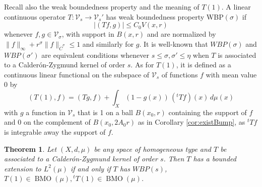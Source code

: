 \documentclass{amsart}
\numberwithin{equation}{section}
\theoremstyle{plain}
\newtheorem{theorem}[equation]{Theorem}
\theoremstyle{definition}
\theoremstyle{remark}
\begin{document}
{{{Recall also the weak boundedness property and the meaning of $T(1)$. A linear continuous operator  $T:\mathcal{V}_{s}\to \mathcal{V}_{s}'$ has weak boundedness property WBP$(\sigma)$ if  $$
 | (Tf,g)| \le C_{0} V(x,r)
 $$
 whenever $f,g \in \mathcal{V}_{\sigma}$, with support in $B(x,r)$ and are normalized by $\|f\|_{\infty}+ r^\sigma\|f\|_{\dot C^\sigma}\le 1$ and similarly for $g$. It is well-known that $WBP(\sigma)$ and $WBP(\sigma')$ are equivalent conditions whenever $s\le \sigma,\sigma'\le \eta$ when $T$ is associated to a Calder\'on-Zygmund kernel of order $s$. 
As for $T(1)$, it is defined as a continuous linear functional on the subspace of $\mathcal{V}_{s}$ of functions  $f$ with mean value 0 by 
 $$
 (T(1), f)= (Tg, f) + \int_{X}(1-g(x)) \, (^tTf)(x)\, d\mu(x)
 $$
 with $g$ a function in $\mathcal{V}_{s}$ that is 1 on a ball $B(x_{0},r)$ containing the support of $f$ and 0 on the complement of $B(x_{0},2A_{0}r)$ as in Corollary \ref{cor:existBump}, as ${}^tTf$ is integrable away  the support of $f$.
 

 
 \begin{theorem} Let $(X,d,\mu)$ be any space of homogeneous type and $T$ be associated to a Calder\'on-Zygmund kernel of order $s$. Then $T$  has a bounded extension to $L^2(\mu)$  if and only if $T$ has $WBP(s)$, $T(1) \in {\operatorname{BMO}}(\mu), {}^tT(1)\in {\operatorname{BMO}}(\mu)$. 
 \end{theorem}
 
 
 

  

 
 

 
  
}}}
\end{document}
